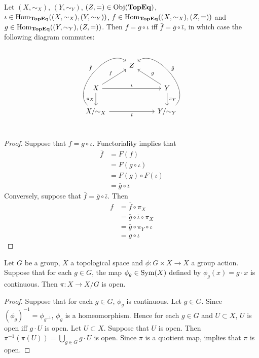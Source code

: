 \documentclass{book}
\begin{document}
	\begin{ex}  
		Let $(X, \sim_X)$, $(Y, \sim_Y)$, $(Z, =)  \in \operatorname{Obj}(\operatorname*{\text{\textbf{TopEq}}})$, $\iota \in \operatorname{Hom}_{\operatorname*{\text{\textbf{TopEq}}}}((X, \sim_X), (Y, \sim_Y))$,  $ f \in \operatorname{Hom}_{\operatorname*{\text{\textbf{TopEq}}}}((X, \sim_X), (Z, =))$ and  $ g \in \operatorname{Hom}_{\operatorname*{\text{\textbf{TopEq}}}}((Y, \sim_Y), (Z, =))$. 
		Then $f = g \circ \iota $ iff $\bar{f} = \bar{g} \circ \bar{\iota}$, in which case the following diagram commutes: 
		\[ 
		\begin{tikzcd}
			& Z & \\
			X  \arrow[rr, "\iota"]  \arrow[d, "\pi_X"'] \arrow[ur, "f"] & & Y   \arrow[d, "\pi_Y"] \arrow[ul, "g"']\\
			X/ {\sim_X} \arrow[bend left=90]{uur}{\bar{f}} \arrow[rr, "\bar{\iota}"'] & &  Y / {\sim_Y} \arrow[bend right=90, swap]{uul}{\bar{g}} \\
		\end{tikzcd}
		\]
	\end{ex}

	\begin{proof}
		Suppose that $f = g \circ \iota$. Functoriality implies that 
		\begin{align*}
			\bar{f} 
			& = F(f) \\
			& = F(g \circ \iota) \\
			& = F(g) \circ F(\iota) \\
			&= \bar{g} \circ \bar{\iota}
		\end{align*}
		Conversely, suppose that $\bar{f} = \bar{g} \circ \bar{\iota}$. Then
		\begin{align*}
			f
			& = \bar{f} \circ \pi_X \\
			& = \bar{g} \circ \bar{\iota} \circ \pi_X \\
			& = \bar{g} \circ \pi_Y \circ \iota \\
			& = g \circ \iota 
		\end{align*}
	\end{proof}
	
	\begin{ex}  
		Let $G$ be a group, $X$ a topological space and $\phi: G \times X \rightarrow X$ a group action. Suppose that for each $g \in G$, the map $\phi_g \in \operatorname{Sym}(X)$ defined by $\phi_g(x) = g \cdot x$ is continuous. Then $\pi: X \rightarrow X / G$ is open. 
	\end{ex}

	\begin{proof}
		Suppose that for each $g \in G$, $\phi_g$ is continuous. Let $g \in G$. Since $(\phi_g)^{-1} = \phi_{g^{-1}}$, $\phi_g$ is a homeomorphism. Hence for each $g \in G$ and $U \subset X$, $U$ is open iff $g \cdot U$ is open. Let $U \subset X$. Suppose that $U$ is open. Then $\pi^{-1}(\pi(U)) = \bigcup_{g \in G} g \cdot U$ is open. Since $\pi$ is a quotient map,  implies that $\pi$ is open.
	\end{proof}
\end{document}
